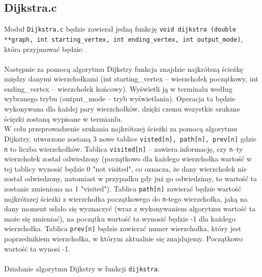 \documentclass[12pt, a4paper]{article}
\begin{document}
\subsection{Dijkstra.c}
Moduł \texttt{Dijkstra.c} będzie zawierał jedną funkcję \texttt{void dijkstra (double **graph, int starting\_vertex, int ending\_vertex, int output\_mode)}, która przyjmować będzie:\\\\

Następnie za pomocą algorytmu Dijkstry funkcja znajdzie najkrótszą ścieżkę między danymi wierzchołkami (int starting\_vertex -- wierzchołek początkowy, int ending\_vertex -- wierzchołek końcowy). Wyświetli ją w terminalu według wybranego trybu (output\_mode -- tryb wyświetlania). Operacja ta będzie wykonywana dla każdej pary wierzchołków, dzięki czemu wszystkie szukane ścięzki zostaną wypisane w termianlu.\\W celu przeprowadzenie szukania najkrótszej ścieżki za pomocą algorytmu Dijkstry, utworzone zostaną 3 nowe tablice \texttt{visted[n], path[n], prev[n]} gdzie \texttt{n} to liczba wierzchołków. Tablica \texttt{visited[n]} -- zawiera informację, czy \texttt{n}--ty wierzchołek został odwiedzony (początkowo dla każdego wierzchołka wartość w tej tablicy wynosić będzie 0 "not visited", co oznacza, że dany wierzchołek nie został odwiedzony, natomiast w przypadku gdy już go odwiedzimy, to wartość ta zostanie zmieniona na 1 "visited"). Tablica \texttt{path[n]} zawierać będzie wartość najkrótszej ścieżki z wierzchołka początkowego do \texttt{n}-tego wierzchołka, jaką na dany moment udało się wyznaczyć (wraz z wykonywaniem algorytmu wartość ta może się zmieniać), na początku wartość ta wynosić będzie -1 dla każdego wierzchołka. Tablica \texttt{prev[n]} będzie zawierać numer wierzchołka, który jest poprzednikiem wierzchołka, w którym aktualnie się znajdujemy. Początkowo wartość ta wynosi -1.\\\\



Działanie algorytmu Dijkstry w funkcji \texttt{dijkstra}:\\\\
\end{document}
